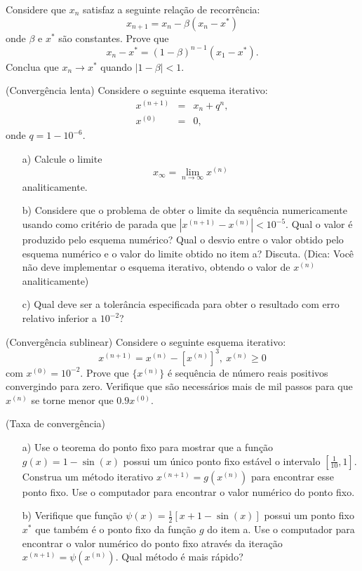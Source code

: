 \begin{exer}Considere que $x_n$ satisfaz a seguinte relação de recorrência:
$$x_{n+1}=x_n - \beta \left(x_n-x^*\right)$$
onde $\beta$ e $x^*$ são constantes.
Prove que $$x_n-x^*=(1-\beta)^{n-1}(x_1-x^*).$$
Conclua que $x_n\to x^*$ quando $|1-\beta|<1$.
\end{exer}

\begin{exer}(Convergência lenta) Considere o seguinte esquema iterativo:
  \begin{eqnarray*}
    x^{(n+1)} &=& x_n+q^n,\\
    x^{(0)} &=& 0,   
  \end{eqnarray*}
onde $q=1-10^{-6}$.
\begin{itemize}
\item[a)] Calcule o limite $$x_\infty=\lim_{n\to\infty}x^{(n)}$$ analiticamente.
\item[b)] Considere que o problema de obter o limite da sequência numericamente usando como critério de parada que $|x^{(n+1)}-x^{(n)}|<10^{-5}$. Qual o valor é produzido pelo esquema numérico? Qual o desvio entre o valor obtido pelo esquema numérico e o valor do limite obtido no item a?  Discuta. (Dica: Você não deve implementar o esquema iterativo, obtendo o valor de $x^{(n)}$ analiticamente)
\item[c)] Qual deve ser a tolerância especificada para obter o resultado com erro relativo inferior a $10^{-2}$?
\end{itemize}
\end{exer}

\begin{exer}(Convergência sublinear) Considere o seguinte esquema iterativo:
$$x^{(n+1)}=x^{(n)}-[x^{(n)}]^3,\ x^{(n)}\geq 0$$
com $x^{(0)}= 10^{-2}$.
Prove que $\{x^{(n)}\}$ é sequência de número reais positivos convergindo para zero. Verifique que são necessários mais de mil passos para que $x^{(n)}$ se torne menor que $0.9 x^{(0)}$.
\end{exer}


\begin{exer}(Taxa de convergência)
\begin{itemize}
\item[a)] Use o teorema do ponto fixo para mostrar que a função $g(x)=1-\sin(x)$ possui um único ponto fixo estável o intervalo $[\frac{1}{10},1]$. Construa um método iterativo $x^{(n+1)}=g(x^{(n)})$ para encontrar esse ponto fixo. Use o computador para encontrar o valor numérico do ponto fixo.
\item[b)] Verifique que função $\psi(x)=\frac{1}{2}\left[x+1-\sin(x)\right]$ possui um ponto fixo $x^*$ que também é o ponto fixo da função $g$ do item a. Use o computador para encontrar o valor numérico do ponto fixo através da iteração $x^{(n+1)}=\psi(x^{(n)})$. Qual método é mais rápido?
\end{itemize}
\end{exer}


